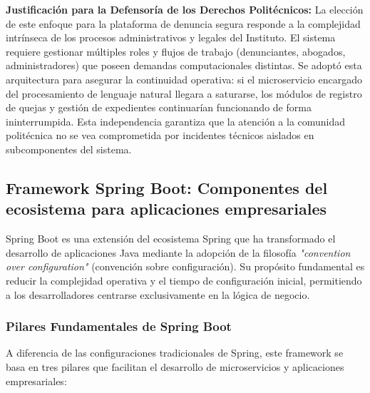 \textbf{Justificación para la Defensoría de los Derechos Politécnicos:}
La elección de este enfoque para la plataforma de denuncia segura responde a la complejidad intrínseca de los procesos administrativos y legales del Instituto. El sistema requiere gestionar múltiples roles y flujos de trabajo (denunciantes, abogados, administradores) que poseen demandas computacionales distintas. Se adoptó esta arquitectura para asegurar la continuidad operativa: si el microservicio encargado del procesamiento de lenguaje natural llegara a saturarse, los módulos de registro de quejas y gestión de expedientes continuarían funcionando de forma ininterrumpida. Esta independencia garantiza que la atención a la comunidad politécnica no se vea comprometida por incidentes técnicos aislados en subcomponentes del sistema.


\subsection{Framework Spring Boot: Componentes del ecosistema para aplicaciones empresariales}

Spring Boot es una extensión del ecosistema Spring que ha transformado el desarrollo de aplicaciones Java mediante la adopción de la filosofía \textit{"convention over configuration"} (convención sobre configuración). Su propósito fundamental es reducir la complejidad operativa y el tiempo de configuración inicial, permitiendo a los desarrolladores centrarse exclusivamente en la lógica de negocio.

\subsubsection{Pilares Fundamentales de Spring Boot}

A diferencia de las configuraciones tradicionales de Spring, este framework se basa en tres pilares que facilitan el desarrollo de microservicios y aplicaciones empresariales:

